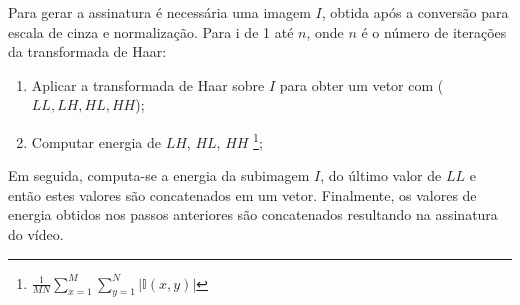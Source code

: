 Para gerar a assinatura é necessária uma imagem $I$, obtida após a conversão para escala de cinza e normalização. Para i de 1 até $n$, onde $n$ é o número de iterações da transformada de Haar:
  \begin{enumerate}
    \item Aplicar a transformada de Haar sobre $I$ para obter um vetor com ($LL, LH, HL, HH$);
    \item Computar energia de $LH$, $HL$, $HH$ \footnote{$  \frac{1}{MN}\sum_{x=1}^M \sum_{y=1}^N |\mathbb{I}(x,y)|$};
  \end{enumerate}
Em seguida, computa-se a energia da subimagem $I$, do último valor de $LL$ e então estes valores são concatenados em um vetor. Finalmente, os valores de energia obtidos nos passos anteriores são concatenados resultando na assinatura do vídeo.






